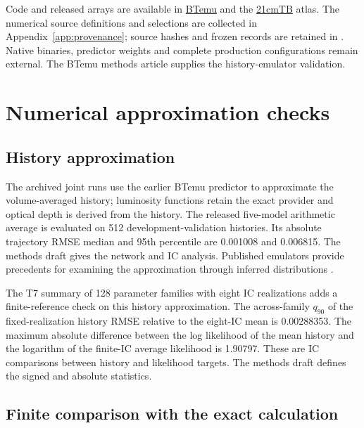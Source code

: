 Code and released arrays are available in \href{https://github.com/HainaHuang729/BTemu}{BTemu} and the \href{https://github.com/HainaHuang729/21cmTB}{21cmTB} atlas. The numerical source definitions and selections are collected in Appendix~\ref{app:provenance}; source hashes and frozen records are retained in . Native binaries, predictor weights and complete production configurations remain external. The BTemu methods article supplies the history-emulator validation.

\clearpage


\clearpage\appendix
\setcounter{figure}{0}

\section{Numerical approximation checks}\label{app:approximation}

\subsection{History approximation}\label{reported-history-accuracy}

The archived joint runs use the earlier BTemu predictor to approximate the volume-averaged history; luminosity functions retain the exact provider and optical depth is derived from the history. The released five-model arithmetic average is evaluated on 512 development-validation histories. Its absolute trajectory RMSE median and 95th percentile are 0.001008 and 0.006815. The methods draft gives the network and IC analysis. Published emulators provide precedents for examining the approximation through inferred distributions \cite{Breitman2024,Breitman2026}.

The T7 summary of 128 parameter families with eight IC realizations adds a finite-reference check on this history approximation. The across-family $q_{90}$ of the fixed-realization history RMSE relative to the eight-IC mean is 0.00288353. The maximum absolute difference between the log likelihood of the mean history and the logarithm of the finite-IC average likelihood is 1.90797. These are IC comparisons between history and likelihood targets. The methods draft defines the signed and absolute statistics.

\subsection{Finite comparison with the exact calculation}

